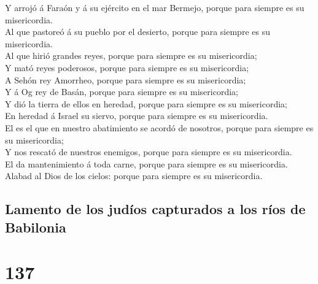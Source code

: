 Y arrojó á Faraón y á su ejército en el mar Bermejo,
porque para siempre es su misericordia.\\
 Al que pastoreó á su pueblo por el desierto, porque para
siempre es su misericordia.\\
 Al que hirió grandes reyes, porque para siempre es su
misericordia;\\
 Y mató reyes poderosos, porque para siempre es su
misericordia;\\
 A Sehón rey Amorrheo, porque para siempre es su
misericordia;\\
 Y á Og rey de Basán, porque para siempre es su
misericordia;\\
 Y dió la tierra de ellos en heredad, porque para siempre
es su misericordia;\\
 En heredad á Israel su siervo, porque para siempre es su
misericordia.\\
 El es el que en nuestro abatimiento se acordó de
nosotros, porque para siempre es su misericordia;\\
 Y nos rescató de nuestros enemigos, porque para siempre
es su misericordia.\\
 El da mantenimiento á toda carne, porque para siempre es
su misericordia.\\
 Alabad al Dios de los cielos: porque para siempre es su
misericordia.

\hypertarget{lamento-de-los-juduxedos-capturados-a-los-ruxedos-de-babilonia}{%
\subsection{Lamento de los judíos capturados a los ríos de
Babilonia}\label{lamento-de-los-juduxedos-capturados-a-los-ruxedos-de-babilonia}}

\hypertarget{section-136}{%
\section{137}\label{section-136}}

